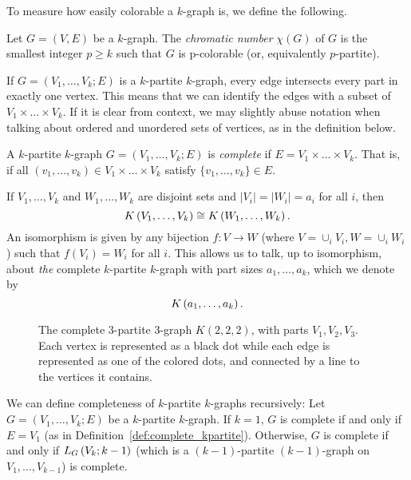 To measure how easily colorable a $k$-graph is, we define the following.

\begin{definition}
    Let $G = (V, E)$ be a $k$-graph.
    The \emph{chromatic number} $\chi(G)$ of $G$ is the smallest integer $p \geq k$ such that
    $G$ is p-colorable (or, equivalently $p$-partite).
\end{definition}

If $G = (V_1, \dots, V_k; E)$ is a $k$-partite $k$-graph,
every edge intersects every part in exactly one vertex.
This means that we can identify the edges with a subset of $ V_1 \times \dots \times V_k$.
If it is clear from context, we may slightly abuse notation when talking about ordered and
unordered sets of vertices, as in the definition below.


\begin{definition} \label{def:complete_kpartite}
    A $k$-partite $k$-graph $G = (V_1, \dots, V_k; E)$ is \emph{complete}
    if $E = V_1 \times \dots \times V_k$.
    That is, if all $(v_1, \dots, v_k) \in V_1 \times \dots \times V_k$
    satisfy $\{v_1, \dots, v_k\} \in E$.
\end{definition}

\begin{remark}
    If $V_1, \dots, V_k$ and $W_1, \dots, W_k$ are disjoint sets
    and $|V_i| = |W_i| = a_i$ for all $i$, then
    \[
        K\left(V_1, \dots, V_k\right) \cong K\left(W_1, \dots, W_k\right).
    \]
    An isomorphism is given by any bijection $f: V \to W$ (where $V=\cup_i V_i, W=\cup_i W_i$)
    such that $f(V_i) = W_i$ for all $i$.
    This allows us to talk, up to isomorphism, about \emph{the} complete $k$-partite $k$-graph
    with part sizes $a_1, \dots, a_k$, which we denote by
    \[
        K\left(a_1, \dots, a_k\right).
    \]
\end{remark}

\begin{figure}[htbp]
    \centering
    
    \caption{The complete 3-partite 3-graph $K(2, 2, 2)$, with parts $V_1, V_2, V_3$.
    Each vertex is represented as a black dot while
    each edge is represented as one of the colored dots, and connected by a line to the vertices it contains.}
    \label{fig:222}
\end{figure}

We can define completeness of $k$-partite $k$-graphs recursively: Let $G = (V_1, \dots, V_k; E)$
be a $k$-partite $k$-graph.
If $k=1$, $G$ is complete if and only if $E = V_1$ (as in Definition~\ref{def:complete_kpartite}).
Otherwise, $G$ is complete if and only if $L_{G}\left(V_k; k-1\right)$ (which is a $(k-1)$-partite $(k-1)$-graph
on $V_1, \dots, V_{k-1}$) is complete.


